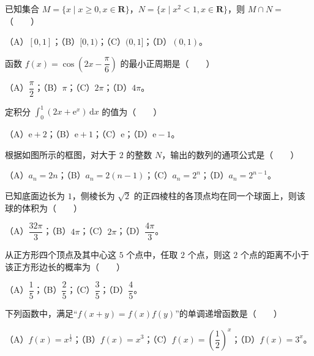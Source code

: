 \begin{question}
已知集合 $M=\{x\mid x\geqslant 0,x\in\mathbf R\}$，$N=\{x\mid x^2<1,x\in\mathbf R\}$，则 $M\cap N=$\mbox{（　　）}

（A）$[0,1]$；（B）$[0,1)$；（C）$(0,1]$；（D）$(0,1)$。

\end{question}
\begin{question}
函数 $f(x)=\cos\left(2x-\dfrac\pi6\right)$ 的最小正周期是\mbox{（　　）}

（A）$\dfrac\pi2$；（B）$\pi$；（C）$2\pi$；（D）$4\pi$。

\end{question}
\begin{question}
定积分 $\displaystyle\int_0^1(2x+\mathrm e^x)\,\mathrm dx$ 的值为\mbox{（　　）}

（A）$\mathrm e+2$；（B）$\mathrm e+1$；（C）$\mathrm e$；（D）$\mathrm e-1$。

\Needspace{0.4\textheight}
\end{question}
\begin{question}
根据如图所示的框图，对大于 $2$ 的整数 $N$，输出的数列的通项公式是\mbox{（　　）}
\nopagebreak[4]
\begin{center}\end{center}
\nopagebreak[4]
（A）$a_n=2n$；（B）$a_n=2(n-1)$；（C）$a_n=2^n$；（D）$a_n=2^{n-1}$。

\end{question}
\begin{question}
已知底面边长为 $1$，侧棱长为 $\sqrt2$ 的正四棱柱的各顶点均在同一个球面上，则该球的体积为\mbox{（　　）}

（A）$\dfrac{32\pi}{3}$；（B）$4\pi$；（C）$2\pi$；（D）$\dfrac{4\pi}{3}$。

\end{question}
\begin{question}
从正方形四个顶点及其中心这 $5$ 个点中，任取 $2$ 个点，则这 $2$ 个点的距离不小于该正方形边长的概率为\mbox{（　　）}

（A）$\dfrac15$；（B）$\dfrac25$；（C）$\dfrac35$；（D）$\dfrac45$。

\end{question}
\begin{question}
下列函数中，满足“$f(x+y)=f(x)f(y)$”的单调递增函数是\mbox{（　　）}

（A）$f(x)=x^{\frac12}$；（B）$f(x)=x^3$；（C）$f(x)=\left(\dfrac12\right)^x$；（D）$f(x)=3^x$。

\end{question}
